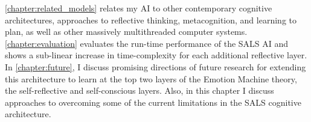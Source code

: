 {\mbox{\autoref{chapter:related_models}}} relates my AI to other
contemporary cognitive architectures, approaches to reflective
thinking, metacognition, and learning to plan, as well as other
massively multithreaded computer systems.
{\mbox{\autoref{chapter:evaluation}}} evaluates the run-time
performance of the SALS AI and shows a sub-linear increase in
time-complexity for each additional reflective layer.  In
{\mbox{\autoref{chapter:future}}}, I discuss promising directions of
future research for extending this architecture to learn at the top
two layers of the Emotion Machine theory, the self-reflective and
self-conscious layers.  Also, in this chapter I discuss approaches to
overcoming some of the current limitations in the SALS cognitive
architecture.

